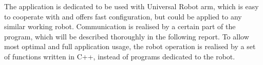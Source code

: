 The application is dedicated to be used with Universal Robot arm, which is easy to cooperate with and offers fast configuration, but could be applied to any similar working robot. Communication is realised by a certain part of the program, which will be described thoroughly in the following report. To allow most optimal and full application usage, the robot operation is realised by a set of functions written in C++, instead of programs dedicated to the robot. 
